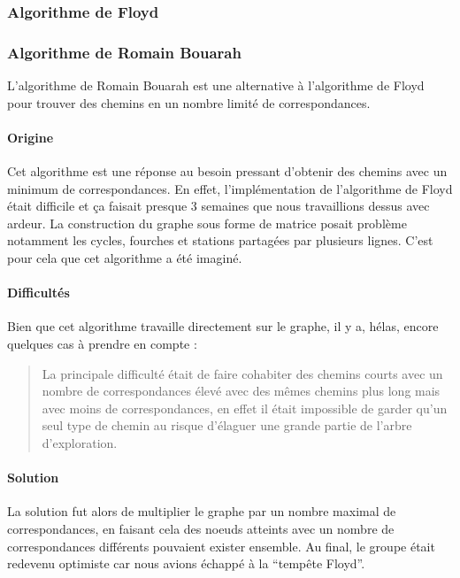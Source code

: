 \documentclass[french, 12pt]{article}
\begin{document}
\subsubsection{Algorithme de Floyd}

\subsubsection{Algorithme de Romain Bouarah}
L'algorithme de Romain Bouarah est une alternative à l'algorithme de Floyd pour trouver des chemins en un nombre limité de correspondances.

\paragraph{Origine}
Cet algorithme est une réponse au besoin pressant d'obtenir des chemins avec un minimum de correspondances.
En effet, l'implémentation de l'algorithme de Floyd était difficile et ça faisait presque 3 semaines que nous travaillions dessus avec ardeur.
La construction du graphe sous forme de matrice posait problème notamment les cycles, fourches et stations partagées par plusieurs lignes.
C'est pour cela que cet algorithme a été imaginé.

\paragraph{Difficultés}
Bien que cet algorithme travaille directement sur le graphe, il y a, hélas, encore quelques cas à prendre en compte :

\begin{quote}  
  La principale difficulté était de faire cohabiter des chemins courts avec un nombre de correspondances élevé avec des mêmes chemins plus long mais avec moins de correspondances, en effet il était impossible de garder qu'un seul type de chemin au risque d'élaguer une grande partie de l'arbre d'exploration.
\end{quote}

\paragraph{Solution}
La solution fut alors de multiplier le graphe par un nombre maximal de correspondances, en faisant cela des noeuds atteints avec un nombre de correspondances différents pouvaient exister ensemble.
Au final, le groupe était redevenu optimiste car nous avions échappé à la ``tempête Floyd''.
\end{document}
